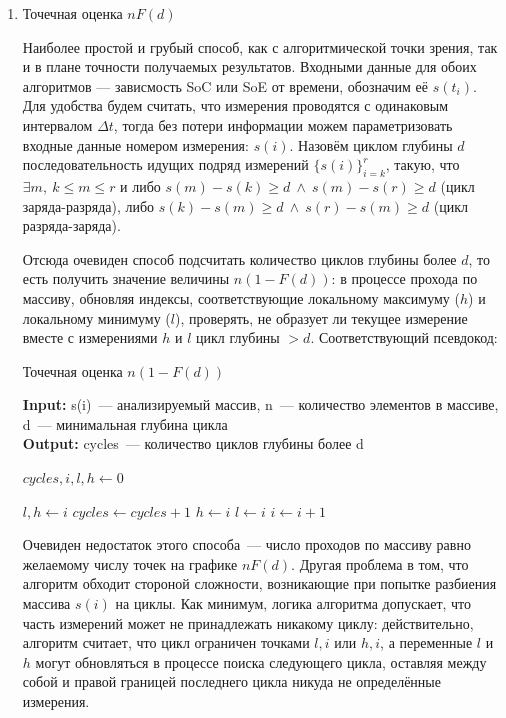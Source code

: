 \begin{enumerate}
\item Точечная оценка $nF(d)$

Наиболее простой и грубый способ, как с алгоритмической точки зрения, так и в плане точности получаемых результатов.
Входными данные для обоих алгоритмов --- зависмость SoC или SoE от времени, обозначим её $s(t_i)$.
Для удобства будем считать, что измерения проводятся с одинаковым интервалом $\Delta t$, тогда без потери информации можем параметризовать входные данные номером измерения: $s(i)$.
Назовём циклом глубины $d$ последовательность идущих подряд измерений $\{s(i)\}_{i=k}^{r}$, такую, что 
$\exists m,~ k \leq m \leq r$ 
и либо $s(m) - s(k) \geq d ~\wedge~ s(m) - s(r) \geq d$ (цикл заряда-разряда), либо
 $s(k) - s(m) \geq d ~\wedge~ s(r) - s(m) \geq d$ (цикл разряда-заряда).
 
Отсюда очевиден способ подсчитать количество циклов глубины более $d$, то есть получить значение величины $n(1 - F(d))$: в процессе прохода по массиву, обновляя индексы, соответствующие локальному максимуму ($h$) и локальному минимуму ($l$), проверять, не образует ли текущее измерение вместе с измерениями $h$ и $l$ цикл глубины $ > d$.
Соответствующий псевдокод:

\begin{algorithm}
\caption{Точечная оценка $n(1 - F(d))$}\label{alg:simple-cycle}
\hspace*{\algorithmicindent} \textbf{Input:} s(i)~--- анализируемый массив, n~--- количество элементов в массиве, d~--- минимальная глубина цикла \\
\hspace*{\algorithmicindent} \textbf{Output:} cycles~--- количество циклов глубины более d 

\begin{algorithmic}[1]
\State $cycles, i, l, h \gets 0$


    \State $l,h \gets i$
    \State $cycles \gets cycles +1$
\Else
        \State $h \gets i$
    \EndIf
        \State $l \gets i$
    \EndIf
\EndIf
\State $i \gets i+1$
\EndWhile
 
\end{algorithmic}
\end{algorithm}

Очевиден недостаток этого способа~--- число проходов по массиву равно желаемому числу точек на графике $nF(d)$.
Другая проблема в том, что алгоритм обходит стороной сложности, возникающие при попытке разбиения массива $s(i)$ на циклы.
Как минимум, логика алгоритма допускает, что часть измерений может не принадлежать никакому циклу: действительно, алгоритм считает, что цикл ограничен точками $l, i$ или $h, i$, а переменные $l$ и $h$ могут обновляться в процессе поиска следующего цикла, оставляя между собой и правой границей последнего цикла никуда не определённые измерения.


\end{enumerate}
